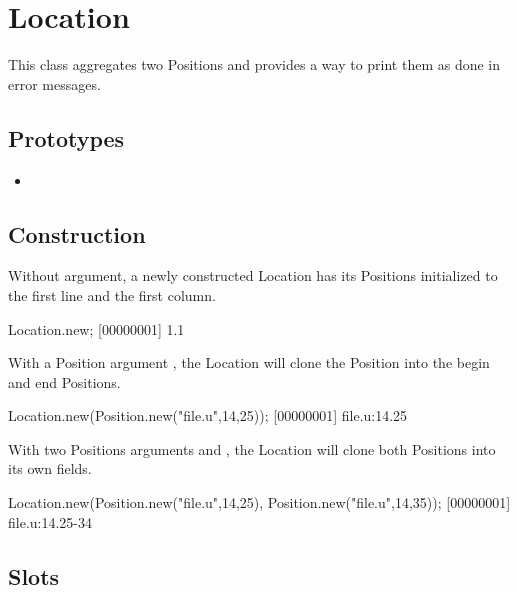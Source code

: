 \section{Location}

This class aggregates two Positions and provides a way to print them as done
in error messages.

\subsection{Prototypes}
\begin{itemize}
\item {}
\end{itemize}

\subsection{Construction}

Without argument, a newly constructed Location has its Positions initialized
to the first line and the first column.

\begin{urbiscript}[firstnumber=1]
Location.new;
[00000001] 1.1
\end{urbiscript}

With a Position argument , the Location will clone the Position into
the begin and end Positions.

\begin{urbiscript}[firstnumber=1]
Location.new(Position.new("file.u",14,25));
[00000001] file.u:14.25
\end{urbiscript}

With two Positions arguments  and , the Location will
clone both Positions into its own fields.

\begin{urbiscript}[firstnumber=1]
Location.new(Position.new("file.u",14,25), Position.new("file.u",14,35));
[00000001] file.u:14.25-34
\end{urbiscript}

\subsection{Slots}


